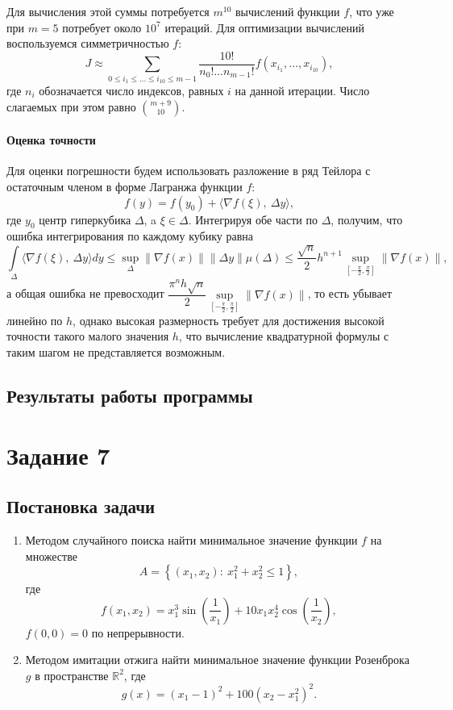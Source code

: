 \documentclass[16pt]{article}
\begin{document}
Для вычисления этой суммы потребуется $m^{10}$ вычислений функции $f$, что уже при $m = 5$ потребует около $10^7$ итераций. Для оптимизации вычислений воспользуемся симметричностью $f$:
$$J \approx \sum_{0 \leq i_1 \leq \ldots \leq i_{10} \leq m-1} \dfrac{10!}{n_0!\ldots n_{m-1}!}f(x_{i_1}, \ldots, x_{i_{10}}),$$
где $n_i$ обозначается число индексов, равных $i$ на данной итерации. Число слагаемых при этом равно ${m + 9 \choose 10}$. 

\paragraph{Оценка точности} Для оценки погрешности будем использовать разложение в ряд Тейлора с остаточным членом в форме Лагранжа функции $f$:
$$f(y) = f(y_0) + \langle \nabla f(\xi), \ \Delta y\rangle,$$
где $y_0$ центр гиперкубика $\Delta$, a $\xi \in \Delta$. Интегрируя обе части по $\Delta$, получим, что ошибка интегрирования по каждому кубику равна
$$\int\limits_\Delta \langle \nabla f(\xi), \ \Delta y\rangle dy \leq \sup_\Delta \|\nabla f(x)\|\|\Delta y\|\mu(\Delta) \leq \dfrac{\sqrt{n}}{2}h^{n+1}\sup_{\left[-\frac{\pi}2, \frac{\pi}2\right]} \|\nabla f(x)\|,$$
а общая ошибка не превосходит $\dfrac{\pi^nh\sqrt{n}}{2}\sup\limits_{\left[-\frac{\pi}2, \frac{\pi}2\right]} \|\nabla f(x)\|$, то есть убывает линейно по $h$, однако высокая размерность требует для достижения высокой точности такого малого значения $h$, что вычисление квадратурной формулы с таким шагом не представляется возможным.
\subsection{Результаты работы программы}

\section{Задание 7}
\subsection{Постановка задачи}
\begin{enumerate}
	\item Методом случайного поиска найти минимальное значение функции $f$ на множестве $$A = \left\{(x_1, x_2)\colon \ x_1^2 + x_2^2 \leq 1\right\},$$ где 
 $$f(x_1, x_2) = x_1^3\sin\left(\dfrac{1}{x_1}\right) + 10x_1x_2^4 \cos\left(\dfrac{1}{x_2}\right),$$
 $f(0, 0) = 0$ по непрерывности.
	\item Методом имитации отжига найти минимальное значение функции Розенброка $g$ в пространстве $\mathbb{R}^2$, где
$$g(x) = (x_1 - 1)^2 + 100(x_2 - x_1^2)^2.$$
\end{enumerate}
\end{document}
